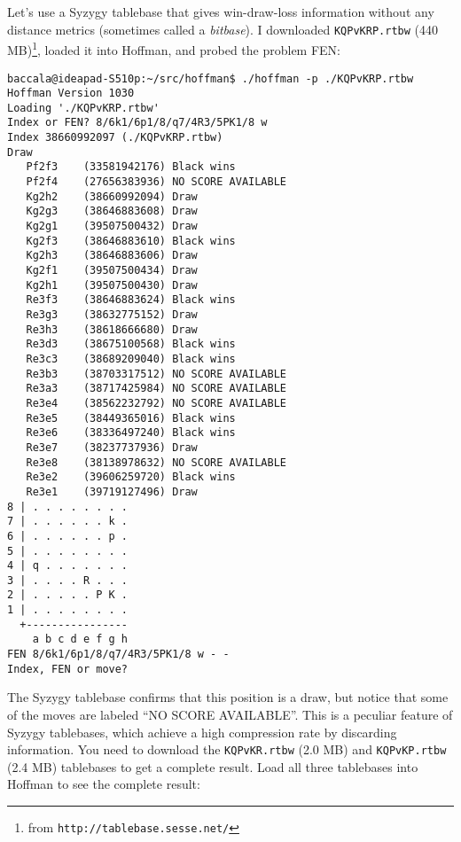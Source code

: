 \documentclass[11pt]{article}
\begin{document}
Let's use a Syzygy tablebase that gives win-draw-loss information
without any distance metrics (sometimes called a {\it bitbase}).  I
downloaded {\tt KQPvKRP.rtbw} (440 MB)\footnote{from
  \tt{http://tablebase.sesse.net/}}, loaded it into Hoffman, and
probed the problem FEN:

\begin{verbatim}
baccala@ideapad-S510p:~/src/hoffman$ ./hoffman -p ./KQPvKRP.rtbw
Hoffman Version 1030
Loading './KQPvKRP.rtbw'
Index or FEN? 8/6k1/6p1/8/q7/4R3/5PK1/8 w
Index 38660992097 (./KQPvKRP.rtbw)
Draw
   Pf2f3    (33581942176) Black wins
   Pf2f4    (27656383936) NO SCORE AVAILABLE
   Kg2h2    (38660992094) Draw
   Kg2g3    (38646883608) Draw
   Kg2g1    (39507500432) Draw
   Kg2f3    (38646883610) Black wins
   Kg2h3    (38646883606) Draw
   Kg2f1    (39507500434) Draw
   Kg2h1    (39507500430) Draw
   Re3f3    (38646883624) Black wins
   Re3g3    (38632775152) Draw
   Re3h3    (38618666680) Draw
   Re3d3    (38675100568) Black wins
   Re3c3    (38689209040) Black wins
   Re3b3    (38703317512) NO SCORE AVAILABLE
   Re3a3    (38717425984) NO SCORE AVAILABLE
   Re3e4    (38562232792) NO SCORE AVAILABLE
   Re3e5    (38449365016) Black wins
   Re3e6    (38336497240) Black wins
   Re3e7    (38237737936) Draw
   Re3e8    (38138978632) NO SCORE AVAILABLE
   Re3e2    (39606259720) Black wins
   Re3e1    (39719127496) Draw
8 | . . . . . . . .
7 | . . . . . . k .
6 | . . . . . . p .
5 | . . . . . . . .
4 | q . . . . . . .
3 | . . . . R . . .
2 | . . . . . P K .
1 | . . . . . . . .
  +----------------
    a b c d e f g h
FEN 8/6k1/6p1/8/q7/4R3/5PK1/8 w - -
Index, FEN or move?
\end{verbatim}

The Syzygy tablebase confirms that this position is a draw, but notice
that some of the moves are labeled ``NO SCORE AVAILABLE''.  This is a
peculiar feature of Syzygy tablebases, which achieve a high
compression rate by discarding information.  You need to download
the {\tt KQPvKR.rtbw} (2.0 MB) and {\tt KQPvKP.rtbw} (2.4 MB)
tablebases to get a complete result.  Load all three tablebases
into Hoffman to see the complete result:
\end{document}
